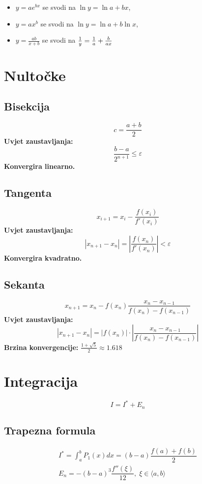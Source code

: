 \begin{itemize}
    \item $y=ae^{bx}$ se svodi na $\ln y = \ln a+bx$,
    \item $y=ax^b$ se svodi na $\ln y = \ln a+b\ln x$,
    \item $y=\frac{ab}{x+b}$ se svodi na ${1\over y}={1\over a}+{b\over ax}$
\end{itemize}

\section{Nultočke}

\begin{multicols}{2}
\subsection{Bisekcija}
$$c = \frac{a + b}{2}$$
\noindent
\textbf{Uvjet zaustavljanja:}
$$\frac{b-a}{2^{n+1}} \leq \varepsilon$$
\textbf{Konvergira linearno.}

\columnbreak

\subsection{Tangenta}
$$x_{i+1} = x_i - \frac{f(x_i)}{f'(x_i)}$$
\noindent
\textbf{Uvjet zaustavljanja:}
$$|x_{n+1} - x_n| = \left| \frac{f(x_n)}{f'(x_n)} \right| < \varepsilon$$
\textbf{Konvergira kvadratno.}
\end{multicols}

\subsection{Sekanta}
$$x_{n+1} = x_n - f(x_n)\dfrac{x_n-x_{n-1}}{f(x_n)-f(x_{n-1})}$$
\noindent
\textbf{Uvjet zaustavljanja:}
$$|x_{n+1}-x_n| = |f(x_n)|\cdot\left|\frac{x_n-x_{n-1}}{f(x_n)-f(x_{n-1})}\right|$$
\textbf{Brzina konvergencije:} $\frac{1+\sqrt{5}}{2}\approx 1.618$

\section{Integracija}

$$
I = I^* + E_n
$$

\subsection{Trapezna formula}
\begin{gather*}
I^* = \int_a^b P_1(x)dx = (b-a)\dfrac{f(a)+f(b)}{2}\\
E_n = -(b-a)^3\dfrac{f''(\xi)}{12},\; \xi\in\langle a, b \rangle
\end{gather*}

